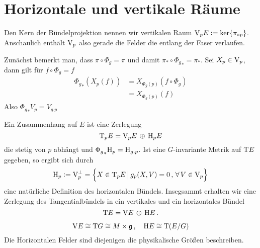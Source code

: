 \section{Horizontale und vertikale Räume}
Den Kern der Bündelprojektion nennen wir vertikalen Raum $\mathrm{V}_p
E:=\ker\{\pi_{*p}\}$. Anschaulich enthält $\mathrm{V}_p$ also gerade die Felder die
entlang der Faser verlaufen.
\begin{bemerkung}
Zunächst bemerkt man, dass
$\pi\circ\Phi_g=\pi$ und damit $\pi_*\circ{\Phi_g}_*=\pi_*$. Sei $X_p\in \mathrm{V}_p$, dann gilt für 
$f\circ \Phi_g = f$ 
\begin{equation}
\begin{split}
{\Phi_g}_*\left(X_p(f)\right)&=X_{\Phi_g(p)}(f\circ\Phi_g)\\
&=X_{\Phi_g(p)}(f)
\end{split}
\end{equation}
Also ${\Phi_g}_*V_p=V_{g.p}$
\end{bemerkung}
Ein Zusammenhang auf $E$ ist eine Zerlegung 
\begin{equation}
\mathrm{T}_p E=\mathrm{V}_p E\,\oplus\, \mathrm{H}_p E
\end{equation}
die stetig von $p$ abhängt und ${\Phi_g}_*\mathrm{H}_p=\mathrm{H}_{g.p}$.
Ist eine $G$-invariante Metrik auf $\mathrm{T} E$ gegeben, so ergibt sich durch  
\begin{equation}
\Horp:=\Verp^\perp=\left\{X\in \Tanp E\,\big|\, g_p(X,V)=0\,,\,\forall\, V\in
\Verp\right\}\,
\end{equation}
eine natürliche Definition des horizontalen Bündels.
Insegsammt erhalten wir eine Zerlegung des Tangentialbündels in ein vertikales
und ein horizontales Bündel
\begin{equation}
\mathrm{T} E=\mathrm{V} E\,\oplus\, \mathrm{H} E\,.
\end{equation}

\begin{equation}
\mathrm{V} E\cong \mathrm{T} G\cong M\times \mathfrak{g}\,,\quad
\mathrm{H} E\cong \mathrm{T}  (E/G)
\end{equation}
Die Horizontalen Felder sind diejenigen die physikalische Größen beschreiben. 

